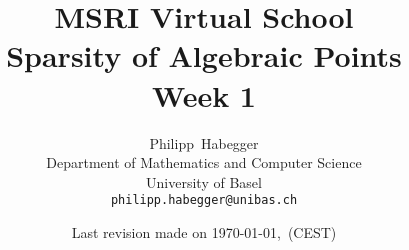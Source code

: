 \documentclass[oneside]{scrbook}
\begin{document}
\title{MSRI Virtual School \\ Sparsity of Algebraic Points \\ Week 1}
\author{Philipp~Habegger \\ Department of Mathematics and Computer
  Science \\ University of Basel \\ \texttt{philipp.habegger@unibas.ch}}
\date{Last revision made on \today, \currenttime \,(CEST)}



\maketitle
\tableofcontents

\setcounter{chapter}{-1}















\vfill\hfill\texttt{}
\end{document}
